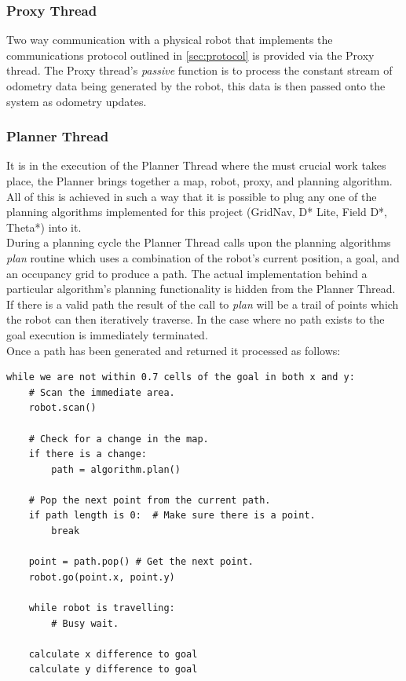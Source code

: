 \subsubsection*{Proxy Thread}
\noindent
Two way communication with a physical robot that implements the communications protocol outlined in \ref{sec:protocol} is provided via the Proxy thread. The Proxy thread's \textit{passive} function is to process the constant stream of odometry data being generated by the robot, this data is then passed onto the system as odometry updates. 

\subsubsection*{Planner Thread}
\noindent
It is in the execution of the Planner Thread where the must crucial work takes place, the Planner brings together a map, robot, proxy, and planning algorithm. All of this is achieved in such a way that it is possible to plug any one of the planning algorithms implemented for this project (GridNav, D* Lite, Field D*, Theta*) into it. \\

\noindent
During a planning cycle the Planner Thread calls upon the planning algorithms \textit{plan} routine which uses a combination of the robot's current position, a goal, and an occupancy grid to produce a path. The actual implementation behind a particular algorithm's planning functionality is hidden from the Planner Thread. If there is a valid path the result of the call to \textit{plan} will be a trail of points which the robot can then iteratively traverse. In the case where no path exists to the goal execution is immediately terminated. \\

\noindent
Once a path has been generated and returned it processed as follows: \\

\begin{lstlisting}
while we are not within 0.7 cells of the goal in both x and y:
	# Scan the immediate area.
	robot.scan()
	
	# Check for a change in the map.
	if there is a change:
		path = algorithm.plan()
		
	# Pop the next point from the current path.
	if path length is 0:  # Make sure there is a point.
		break

	point = path.pop() # Get the next point.
	robot.go(point.x, point.y)
	
	while robot is travelling:
		# Busy wait.

	calculate x difference to goal
	calculate y difference to goal
\end{lstlisting}

